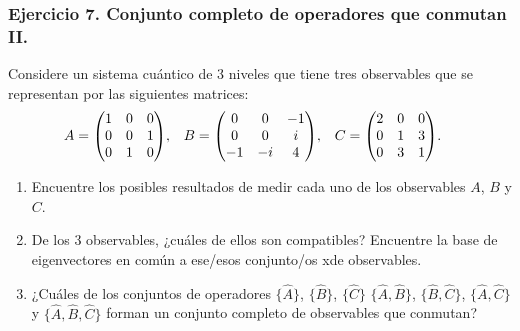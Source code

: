 \documentclass[11pt,letterpaper]{article}
\begin{document}
\subsubsection*{Ejercicio 7.  Conjunto completo de operadores que conmutan II.}
Considere un sistema cuántico de 3 niveles que tiene tres observables
que se representan por las siguientes matrices:
\begin{align}
A&=\mqty(1&0&0\\0&0&1\\0&1&0),&
B&=\mqty(0&0&-1\\0&0&i\\-1&-i&4),&
C&=\mqty(2&0&0\\0&1&3\\0&3&1).
\end{align}
\begin{enumerate}
\item Encuentre los posibles resultados de medir cada uno de los observables 
$A$, $B$ y $C$.
\item De los 3 observables, ¿cuáles de ellos son compatibles?
Encuentre la base de eigenvectores en común a ese/esos conjunto/os 
xde observables. 
\item ¿Cuáles de los conjuntos de operadores $\{ \hat A\}$, $\{ \hat B\}$, 
$\{ \hat C\}$
$\{ \hat A, \hat B\}$, $\{ \hat B, \hat C\}$, $\{ \hat A, \hat C\}$ y
$\{ \hat A, \hat B, \hat C\}$ forman un conjunto completo de observables que 
conmutan? 
\end{enumerate}
\end{document}
